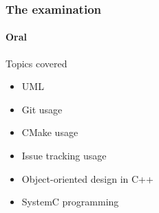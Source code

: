 \begin{frame}
\frametitle{The examination}
\framesubtitle{Oral}

\begin{block}{Topics covered}
\begin{itemize}
\item UML
\item Git usage
\item CMake usage
\item Issue tracking usage
\item Object-oriented design in C++
\item SystemC programming
\end{itemize}
\end{block}

\end{frame}